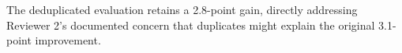 The deduplicated evaluation retains a 2.8-point gain, directly addressing Reviewer 2's documented concern that duplicates might explain the original 3.1-point improvement.
